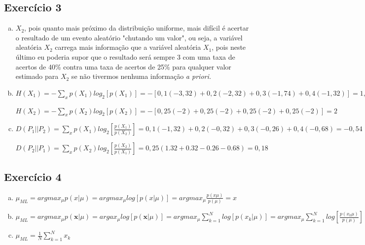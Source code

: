 \documentclass[a4paper, 12pt]{article}
\begin{document}
\subsection*{Exercício 3}

\begin{enumerate}[a)]
\item
$X_2$, pois quanto mais próximo da distribuição uniforme, mais difícil é acertar o resultado de um evento aleatório "chutando um valor", ou seja, a variável aleatória $X_2$ carrega mais informação que a variável aleatória $X_1$, pois neste último eu poderia supor que o resultado será sempre 3 com uma taxa de acertos de 40\% contra uma taxa de acertos de 25\% para qualquer valor estimado para $X_2$ se não tivermos nenhuma informação \em a priori\em .


\item
$H(X_1) = - \sum\limits_x p(X_1)log_2[p(X_1)] = -[0,1(-3,32) + 0,2(-2,32) + 0,3(-1,74) + 0,4(-1,32)] = 1,85$

$H(X_2) = - \sum\limits_x p(X_2)log_2[p(X_2)] = - [0,25 (-2) + 0,25 (-2) + 0,25 (-2) + 0,25(-2)] = 2$


\item
$D(P_1 || P_2) = \sum\limits_x p(X_1)log_2\left[\frac{p(X_1)}{p(X_2)}\right] = 0,1(-1,32) + 0,2(-0,32) + 0,3(-0,26) + 0,4(-0,68) = -0,54$

$D(P_2 || P_1) = \sum\limits_x p(X_2)log_2\left[\frac{p(X_2)}{p(X_1)}\right] = 0,25(1.32 +  0.32 - 0.26 -0.68) = 0,18$

\end{enumerate}

\subsection*{Exercício 4}

\begin{enumerate}[a)]
\item
$\mu_{ML} = arg max_\mu p(x|\mu) = arg max_\mu log[p(x|\mu)] = arg max_\mu \frac{p(x\mu)}{p(\mu)} = x$

\item
$\mu_{ML} = arg max_\mu p(\mathbf{x}|\mu) = arg ax_\mu log[p(\mathbf{x}|\mu)] = arg max_\mu \sum\limits_{k=1}^{N} log[p(x_k|\mu)] = arg max_\mu \sum \limits_{k=1}^{N} log\left [ \frac{p(x_k\mu)}{p(\mu)}\right ] $

\item

    $\mu_{ML} = \frac{1}{N} \sum \limits_{k=1}^{N} x_k$

\end{enumerate}
\end{document}

